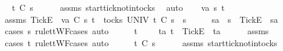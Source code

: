 \ \isamarkupfalse%
\ {\isachardoublequoteopen}t\ {\isasymle}\isactrlsub C\ s{}{\isacharprime}{\isachardoublequoteclose}\isanewline
\ \ \ \ \isamarkupfalse%
\ assms{\isacharparenleft}{}{\isacharparenright}\ start{\isacharunderscore}tick{\isacharunderscore}notin{\isacharunderscore}tocks\ \isamarkupfalse%
\ auto\isanewline
{}\isamarkupfalse%
\isanewline
\ \ \isamarkupfalse%
\ va\ s{}{\isacharprime}\ t\isanewline
\ \ \isamarkupfalse%
\ assms{\isacharcolon}\ {\isachardoublequoteopen}{\isacharbrackleft}Tick{\isacharbrackright}\isactrlsub E\ {\isacharhash}\ va\ {\isasymsubseteq}\isactrlsub C\ s{}{\isacharprime}{\isachardoublequoteclose}\ {\isachardoublequoteopen}t\ {\isasymin}\ tocks\ UNIV{\isachardoublequoteclose}\ {\isachardoublequoteopen}t\ {\isasymle}\isactrlsub C\ s{}{\isacharprime}\ {\isacharat}\ s{}{\isachardoublequoteclose}\isanewline
\ \ \isamarkupfalse%
\ \isamarkupfalse%
\ s{}{\isacharprime}a\ \ {\isachardoublequoteopen}s{}{\isacharprime}\ {\isacharequal}\ {\isacharbrackleft}Tick{\isacharbrackright}\isactrlsub E\ {\isacharhash}\ s{}{\isacharprime}a{\isachardoublequoteclose}\isanewline
\ \ \ \ \isamarkupfalse%
\ {\isacharparenleft}cases\ s{}{\isacharprime}\ rule{\isacharcolon}ttWF{\isachardot}cases{\isacharcomma}\ auto{\isacharparenright}\isanewline
\ \ \isamarkupfalse%
\ \isamarkupfalse%
\ {\isachardoublequoteopen}t\ {\isacharequal}\ {\isacharbrackleft}{\isacharbrackright}\ {\isasymor}\ {\isacharparenleft}{\isasymexists}\ ta{\isachardot}\ t\ {\isacharequal}\ {\isacharbrackleft}Tick{\isacharbrackright}\isactrlsub E\ {\isacharhash}\ ta{\isacharparenright}{\isachardoublequoteclose}\isanewline
\ \ \ \ \isamarkupfalse%
\ assms{\isacharparenleft}{}{\isacharparenright}\ \isamarkupfalse%
\ {\isacharparenleft}cases\ t\ rule{\isacharcolon}ttWF{\isachardot}cases{\isacharcomma}\ auto{\isacharparenright}\isanewline
\ \ \isamarkupfalse%
\ \isamarkupfalse%
\ {\isachardoublequoteopen}t\ {\isasymle}\isactrlsub C\ s{}{\isacharprime}{\isachardoublequoteclose}\isanewline
\ \ \ \ \isamarkupfalse%
\ assms{\isacharparenleft}{}{\isacharparenright}\ start{\isacharunderscore}tick{\isacharunderscore}notin{\isacharunderscore}tocks\ \isamarkupfalse%
